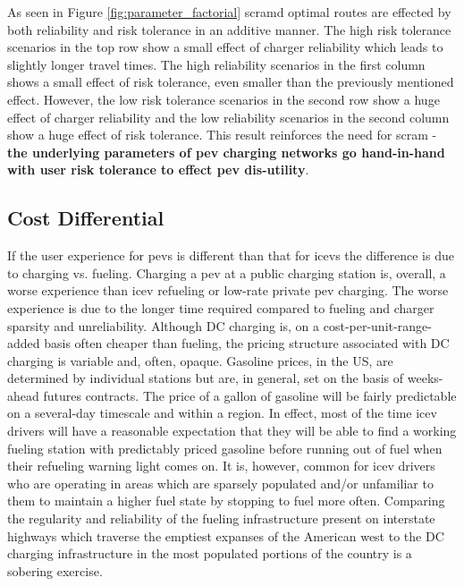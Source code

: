 \documentclass[12pt]{article}
\begin{document}
As seen in Figure \ref{fig:parameter_factorial} \gls{scramd} optimal routes are effected by both reliability and risk tolerance in an additive manner. The high risk tolerance scenarios in the top row show a small effect of charger reliability which leads to slightly longer travel times. The high reliability scenarios in the first column shows a small effect of risk tolerance, even smaller than the previously mentioned effect. However, the low risk tolerance scenarios in the second row show a huge effect of charger reliability and the low reliability scenarios in the second column show a huge effect of risk tolerance. This result reinforces the need for \gls{scram} - \textbf{the underlying parameters of \gls{pev} charging networks go hand-in-hand with user risk tolerance to effect \gls{pev} dis-utility}.

\subsection*{Cost Differential}

If the user experience for \glspl{pev} is different than that for \glspl{icev} the difference is due to charging vs. fueling. Charging a \gls{pev} at a public charging station is, overall, a worse experience than \gls{icev} refueling or low-rate private \gls{pev} charging. The worse experience is due to the longer time required compared to fueling and charger sparsity and unreliability. Although DC charging is, on a cost-per-unit-range-added basis often cheaper than fueling, the pricing structure associated with DC charging is variable and, often, opaque. Gasoline prices, in the US, are determined by individual stations but are, in general, set on the basis of weeks-ahead futures contracts. The price of a gallon of gasoline will be fairly predictable on a several-day timescale and within a region. In effect, most of the time \gls{icev} drivers will have a reasonable expectation that they will be able to find a working fueling station with predictably priced gasoline before running out of fuel when their refueling warning light comes on. It is, however, common for \gls{icev} drivers who are operating in areas which are sparsely populated and/or unfamiliar to them to maintain a higher fuel state by stopping to fuel more often. Comparing the regularity and reliability of the fueling infrastructure present on interstate highways which traverse the emptiest expanses of the American west to the DC charging infrastructure in the most populated portions of the country is a sobering exercise.
\end{document}
